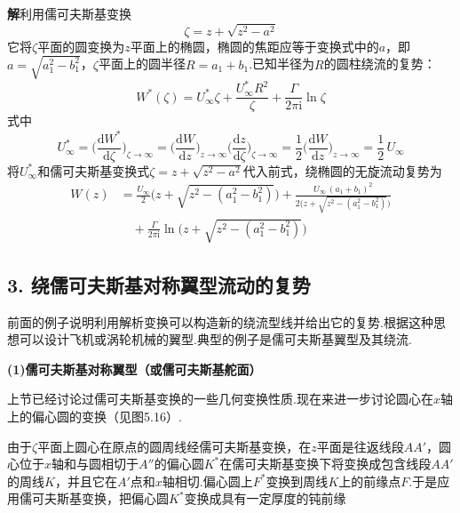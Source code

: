 \noindent\textbf{解}\quad 利用儒可夫斯基变换
\[
\zeta=z+\sqrt{z^{2}-a^{2}}
\]
它将$\zeta$平面的圆变换为$z$平面上的椭圆，椭圆的焦距应等于变换式中的$a$，即$a=\sqrt{a_1^{2}-b_1^{2}}$，$\zeta$平面上的圆半径$R=a_1+b_1$.已知半径为$R$的圆柱绕流的复势：
\[
W^{*}(\zeta)=U_\infty^{*}\zeta+\frac{U_\infty^{*}R^{2}}{\zeta}+\frac{\Gamma}{2\pi\mathrm{i}}\ln\zeta
\]
式中
\[
U_\infty^{*}=\Big(\frac{\mathrm{d}W^{*}}{\mathrm{d}\zeta}\Big)_{\zeta\to\infty}=\Big(\frac{\mathrm{d}W}{\mathrm{d}z}\Big)_{z\to\infty}\Big(\frac{\mathrm{d}z}{\mathrm{d}\zeta}\Big)_{\zeta\to\infty}=\frac{1}{2}\Big(\frac{\mathrm{d}W}{\mathrm{d}z}\Big)_{z\to\infty}=\frac{1}{2}\,U_\infty
\]
将$U_\infty^{*}$和儒可夫斯基变换式$\zeta=z+\sqrt{z^{2}-a^{2}}$代入前式，绕椭圆的无旋流动复势为
\begin{align*}
W(z)&=\frac{U_\infty}{2}\Big(z+\sqrt{z^{2}-(a_1^{2}-b_1^{2})}\Big)+\frac{U_\infty\,(a_1+b_1)^{2}}{2\big(z+\sqrt{z^{2}-(a_1^{2}-b_1^{2})}\big)}\\
&\quad+\frac{\Gamma}{2\pi\mathrm{i}}\ln\Big(z+\sqrt{z^{2}-(a_1^{2}-b_1^{2})}\Big)
\end{align*}

\subsection*{3. 绕儒可夫斯基对称翼型流动的复势}

前面的例子说明利用解析变换可以构造新的绕流型线并给出它的复势.根据这种思想可以设计飞机或涡轮机械的翼型.典型的例子是儒可夫斯基翼型及其绕流.

\textbf{(1)儒可夫斯基对称翼型（或儒可夫斯基舵面）}

上节已经讨论过儒可夫斯基变换的一些几何变换性质.现在来进一步讨论圆心在$x$轴上的偏心圆的变换（见图5.16）.

由于$\zeta$平面上圆心在原点的圆周线经儒可夫斯基变换，在$z$平面是往返线段$AA'$，圆心位于$x$轴和与圆相切于$A''$的偏心圆$K^{*}$在儒可夫斯基变换下将变换成包含线段$AA'$的周线$K$，并且它在$A'$点和$x$轴相切.偏心圆上$F^{*}$变换到周线$K$上的前缘点$F$.于是应用儒可夫斯基变换，把偏心圆$K^{*}$变换成具有一定厚度的钝前缘
